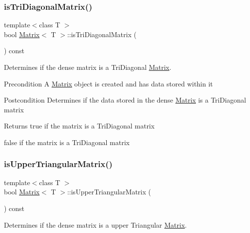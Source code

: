 \subsubsection{\texorpdfstring{isTriDiagonalMatrix()}{isTriDiagonalMatrix()}}
{\footnotesize\ttfamily template$<$class T $>$ \\
bool \mbox{\hyperlink{class_matrix}{Matrix}}$<$ T $>$\+::is\+Tri\+Diagonal\+Matrix (\begin{DoxyParamCaption}{ }\end{DoxyParamCaption}) const}



Determines if the dense matrix is a Tri\+Diagonal \mbox{\hyperlink{class_matrix}{Matrix}}. 

\begin{DoxyPrecond}{Precondition}
A \mbox{\hyperlink{class_matrix}{Matrix}} object is created and has data stored within it 
\end{DoxyPrecond}
\begin{DoxyPostcond}{Postcondition}
Determines if the data stored in the dense \mbox{\hyperlink{class_matrix}{Matrix}} is a Tri\+Diagonal matrix
\end{DoxyPostcond}
\begin{DoxyReturn}{Returns}
true if the matrix is a Tri\+Diagonal matrix 

false if the matrix is a Tri\+Diagonal matrix 
\end{DoxyReturn}
\mbox{\label{class_matrix_a3d177e2d4c6d8ccf7a1c4c651f4bc075}} 
\subsubsection{\texorpdfstring{isUpperTriangularMatrix()}{isUpperTriangularMatrix()}}
{\footnotesize\ttfamily template$<$class T $>$ \\
bool \mbox{\hyperlink{class_matrix}{Matrix}}$<$ T $>$\+::is\+Upper\+Triangular\+Matrix (\begin{DoxyParamCaption}{ }\end{DoxyParamCaption}) const}



Determines if the dense matrix is a upper Triangular \mbox{\hyperlink{class_matrix}{Matrix}}. 

